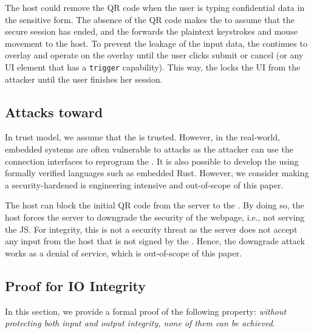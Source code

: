  The host could remove the QR code when the user is typing confidential data in the sensitive form. The absence of the QR code makes the \device to assume that the secure session has ended, and the \device forwards the plaintext keystrokes and mouse movement to the host. To prevent the leakage of the input data, the \device continues to overlay and operate on the overlay until the user clicks submit or cancel (or any UI element that has a \texttt{trigger}  capability). This way, the \device locks the UI from the attacker until the user finishes her session.

\subsection{Attacks toward \device} 
\label{sec:securityAnalysis:device}

In \name trust model, we assume that the \device is trusted. However, in the real-world, embedded systems are often vulnerable to attacks as the attacker can use the connection interfaces to reprogram the \device. It is also possible to develop the \device using formally verified languages such as embedded Rust. However, we consider making a security-hardened \device is engineering intensive and out-of-scope of this paper. 


 The host can block the initial QR code from the server to the \device. By doing so, the host forces the server to downgrade the security of the webpage, i.e., not serving the \name JS. For integrity, this is not a security threat as the server does not accept any input from the host that is not signed by the \device. Hence, the downgrade attack works as a denial of service, which is out-of-scope of this paper.


\subsection{Proof for IO Integrity}
\label{sec:securityAnalysis:proof}

In this section, we provide a formal proof of the following property: \emph{without protecting both input and output integrity, none of them can be achieved}. 


